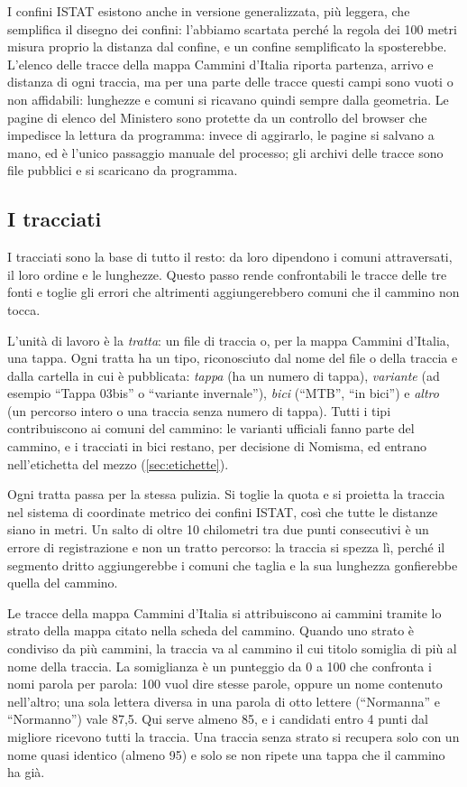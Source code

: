 I confini ISTAT esistono anche in versione generalizzata, più leggera, che semplifica il disegno dei confini: l'abbiamo scartata perché la regola dei 100 metri misura proprio la distanza dal confine, e un confine semplificato la sposterebbe. L'elenco delle tracce della mappa Cammini d'Italia riporta partenza, arrivo e distanza di ogni traccia, ma per una parte delle tracce questi campi sono vuoti o non affidabili: lunghezze e comuni si ricavano quindi sempre dalla geometria. Le pagine di elenco del Ministero sono protette da un controllo del browser che impedisce la lettura da programma: invece di aggirarlo, le pagine si salvano a mano, ed è l'unico passaggio manuale del processo; gli archivi delle tracce sono file pubblici e si scaricano da programma.

\subsection{I tracciati}\label{sec:tracciati}

I tracciati sono la base di tutto il resto: da loro dipendono i comuni attraversati, il loro ordine e le lunghezze. Questo passo rende confrontabili le tracce delle tre fonti e toglie gli errori che altrimenti aggiungerebbero comuni che il cammino non tocca.

L'unità di lavoro è la \emph{tratta}: un file di traccia o, per la mappa Cammini d'Italia, una tappa. Ogni tratta ha un tipo, riconosciuto dal nome del file o della traccia e dalla cartella in cui è pubblicata: \emph{tappa} (ha un numero di tappa), \emph{variante} (ad esempio “Tappa 03bis” o “variante invernale”), \emph{bici} (“MTB”, “in bici”) e \emph{altro} (un percorso intero o una traccia senza numero di tappa). Tutti i tipi contribuiscono ai comuni del cammino: le varianti ufficiali fanno parte del cammino, e i tracciati in bici restano, per decisione di Nomisma, ed entrano nell'etichetta del mezzo (\cref{sec:etichette}).

Ogni tratta passa per la stessa pulizia. Si toglie la quota e si proietta la traccia nel sistema di coordinate metrico dei confini ISTAT, così che tutte le distanze siano in metri. Un salto di oltre 10 chilometri tra due punti consecutivi è un errore di registrazione e non un tratto percorso: la traccia si spezza lì, perché il segmento dritto aggiungerebbe i comuni che taglia e la sua lunghezza gonfierebbe quella del cammino.

Le tracce della mappa Cammini d'Italia si attribuiscono ai cammini tramite lo strato della mappa citato nella scheda del cammino. Quando uno strato è condiviso da più cammini, la traccia va al cammino il cui titolo somiglia di più al nome della traccia. La somiglianza è un punteggio da 0 a 100 che confronta i nomi parola per parola: 100 vuol dire stesse parole, oppure un nome contenuto nell'altro; una sola lettera diversa in una parola di otto lettere (“Normanna” e “Normanno”) vale 87,5. Qui serve almeno 85, e i candidati entro 4 punti dal migliore ricevono tutti la traccia. Una traccia senza strato si recupera solo con un nome quasi identico (almeno 95) e solo se non ripete una tappa che il cammino ha già.

